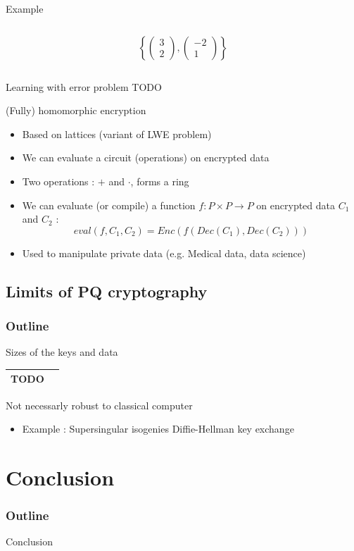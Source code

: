 \documentclass{beamer}
\begin{document}
\begin{frame}{Example}
\begin{columns}[t]
\begin{column}{0.45\textwidth}
		\[\left\{\left(\begin{matrix}3\\2\end{matrix}\right), \left(\begin{matrix}-2\\1\end{matrix}\right)\right\}\]
	\end{column}
	\end{columns}
\end{frame}

\begin{frame}{Learning with error problem}
	TODO
\end{frame}

\begin{frame}{(Fully) homomorphic encryption}
	\begin{itemize}
		\item Based on lattices (variant of LWE problem)
		\item<2-> We can evaluate a circuit (operations) on encrypted data
		\item<2-> Two operations : $+$ and $\cdot$, forms a ring
		\item<3-> We can evaluate (or compile) a function $f : P \times P \rightarrow P$ on encrypted data $C_1$ and $C_2$ :
			\[eval(f, C_1, C_2) = Enc(f(Dec(C_1), Dec(C_2)))\]
		\item<4-> Used to manipulate private data (e.g. Medical data, data science)
	\end{itemize}
\end{frame}

\subsection{Limits of PQ cryptography}
\begin{frame}
  \frametitle{Outline}
\end{frame}
\begin{frame}{Sizes of the keys and data}
	\begin{tabular}{|c|c|}
		\hline
		TODO & \\
		\hline
	\end{tabular}
\end{frame}

\begin{frame}{Not necessarly robust to classical computer}
	\begin{itemize}
		\item Example : Supersingular isogenies Diffie-Hellman key exchange
	\end{itemize}
\end{frame}

\section{Conclusion}
\begin{frame}
  \frametitle{Outline}
  \tableofcontents[currentsection]
\end{frame}
\begin{frame}{Conclusion}
\begin{linenumbers}
\end{linenumbers}
\end{frame}
\end{document}
